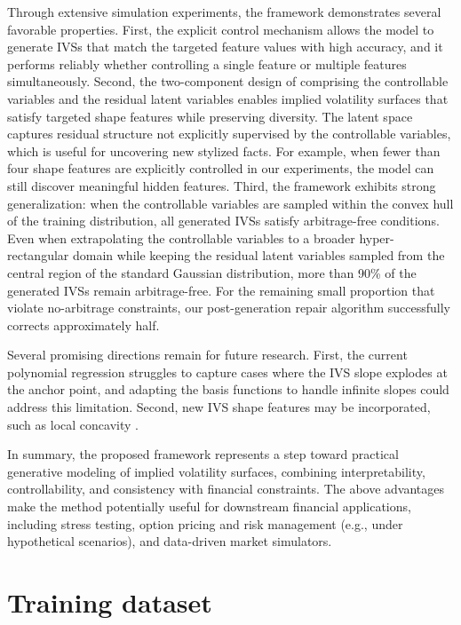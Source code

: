 \documentclass{article}
\begin{document}
{Through extensive simulation experiments, the framework demonstrates several favorable properties. First, the explicit control mechanism allows the model to generate IVSs that match the targeted feature values with high accuracy, and it performs reliably whether controlling a single feature or multiple features simultaneously. Second, the two-component design of comprising the controllable variables and the residual latent variables  enables implied volatility surfaces that satisfy targeted shape features while preserving diversity. The latent space captures residual structure not explicitly supervised by the controllable variables, which is useful for uncovering  new stylized facts. For example,  when fewer than four shape features are explicitly controlled in our experiments, the model can still discover meaningful hidden features.   Third, the framework exhibits strong generalization: when the controllable variables are sampled within the convex hull of the training distribution, all generated IVSs satisfy arbitrage-free conditions. Even when extrapolating the controllable variables to a broader hyper-rectangular domain while keeping the residual latent variables sampled from the central region of the standard Gaussian distribution, more than 90\% of the generated IVSs remain arbitrage-free. For the remaining small proportion that violate no-arbitrage constraints, our post-generation repair algorithm successfully corrects approximately half.  



Several promising directions remain for future research. First, the current polynomial regression struggles to capture cases where the IVS slope explodes at the anchor point, and  adapting the basis functions to handle infinite slopes could address this limitation. Second, new IVS shape features may be incorporated, such as local concavity \citep{alexiou2025pricing}. 



In summary, the proposed framework represents a step toward practical generative modeling of implied volatility surfaces, combining interpretability, controllability, and consistency with financial constraints.  The above advantages make the method potentially useful for downstream financial applications, including stress testing, option pricing  and risk management (e.g., under hypothetical scenarios), and data-driven market simulators.




\appendix
\section{Training dataset}\label{sec:ParaModels}

}
\end{document}
